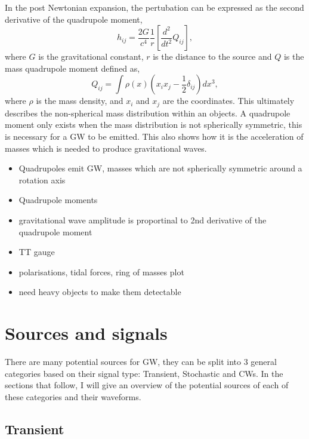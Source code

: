 In the post Newtonian expansion, the pertubation can be expressed as the second derivative of the quadrupole moment,
\begin{equation}
    h_{ij} = \frac{2G}{c^4}\frac{1}{r} \left [ \frac{d^2}{dt^2} Q_{ij} \right],
\end{equation}
where $G$ is the gravitational constant, $r$ is the distance to the source and $Q$ is the mass quadrupole moment defined as,
\begin{equation}
    Q_{ij} = \int \rho(x) \left(x_i x_j - \frac{1}{2}\delta_{ij} \right)dx^3,
\end{equation}
where $\rho$ is the mass density, and $x_i$ and $x_j$ are the coordinates.
This ultimately describes the non-spherical mass distribution within an objects. 
A quadrupole moment only exists when the mass distribution is not spherically symmetric, this is necessary for a \ac{GW} to be emitted.
This also shows how it is the acceleration of masses which is needed to produce gravitational waves.


\begin{itemize}
    \item Quadrupoles emit GW, masses which are not spherically symmetric around a rotation axis
    \item Quadrupole moments
    \item gravitational wave amplitude is proportinal to 2nd derivative of the quadrupole moment
    \item TT gauge
    \item polarisations, tidal forces, ring of masses plot
    \item need heavy objects to make them detectable 
\end{itemize}


\section{\label{sources}Sources and signals}

There are many potential sources for \ac{GW}, they can be split into 3 general categories based on their signal type: Transient, Stochastic and \acp{CW}. 
In the sections that follow, I will give an overview of the potential sources of each of these categories and their waveforms.


\subsection{\label{sources:transient} Transient}

